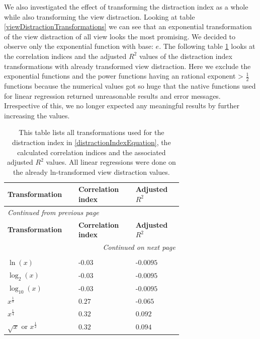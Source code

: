 We also investigated the effect of transforming the distraction index as a whole while also transforming the view distraction.
Looking at table \ref{viewDistractionTransformations} we can see that an exponential transformation of the view distraction of all view
looks the most promising. We decided to observe only the exponential function with base: $e$.
The following table \ref{distractionIndexTransformationsWithTransformedViewDistraction} looks at the correlation indices and the adjusted $R^2$
values of the distraction index transformations with already transformed view distraction. Here we exclude the exponential functions and the power
functions having an rational exponent > $\frac{1}{2}$ functions because the numerical values got so huge that the native functions used for linear
regression returned unreasonable results and error messages. Irrespective of this, we no longer expected any meaningful results by further increasing
the values.

\begin{longtable}{| p{0.24\linewidth} | p{0.25\linewidth} | p{0.20\linewidth}|}
    \hline
    \textbf{Transformation} & \textbf{Correlation index} & \textbf{Adjusted $R^2$} \\
    \hline
    \endfirsthead
    \multicolumn{3}{l}{{\textit{Continued from previous page}}} \\
    \hline
    \textbf{Transformation} & \textbf{Correlation index} & \textbf{Adjusted $R^2$} \\
    \hline
    \endhead
    \hline \multicolumn{3}{r}{{\textit{Continued on next page}}} \\
    \endfoot
    \hline
    \caption{This table lists all transformations used for the distraction index in \ref{distractionIndexEquation}, the calculated correlation indices and the associated adjusted $R^2$ values. All linear regressions were done on the already ln-transformed view distraction values. \label{distractionIndexTransformationsWithTransformedViewDistraction}}\\
    \endlastfoot
    $ \ln(x) $ & -$0.03$ & -$0.0095$ \\
    \hline
    $ \log_{2}(x) $ & -$0.03$ & -$0.0095$ \\
    \hline
    $ \log_{10}(x) $ & -$0.03$ & -$0.0095$ \\
    \hline
    $ x^{\frac{1}{8}} $ & $0.27$ & -$0.065$ \\
    \hline
    $ x^{\frac{1}{4}} $ & $0.32$ & $0.092$ \\
    \hline
    $ \sqrt{x} $ or $ x^{\frac{1}{2}} $ & $0.32$ & $0.094$ \\
\end{longtable}


